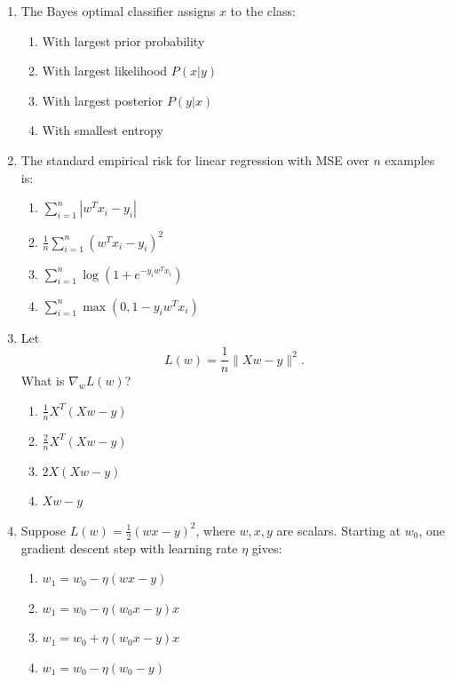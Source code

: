 \documentclass[11pt]{article}
\newcommand{\cmark}{\ding{51}}
\begin{document}
\begin{enumerate}[leftmargin=*]
\item The Bayes optimal classifier assigns $x$ to the class:

\begin{enumerate}[label=\Alph*.]
    \item With largest prior probability
    \item With largest likelihood $P(x|y)$
    \item With largest posterior $P(y|x)$ \cmark
    \item With smallest entropy
\end{enumerate}

\item The standard empirical risk for linear regression with MSE over $n$ examples is:

\begin{enumerate}[label=\Alph*.]
    \item $\sum_{i=1}^n |w^T x_i-y_i|$
    \item $\frac{1}{n}\sum_{i=1}^n (w^T x_i-y_i)^2$ \cmark
    \item $\sum_{i=1}^n \log(1+e^{-y_i w^T x_i})$
    \item $\sum_{i=1}^n \max(0,1-y_iw^Tx_i)$
\end{enumerate}

\item Let
\[
L(w)=\frac{1}{n}\|Xw-y\|^2.
\]
What is $\nabla_w L(w)$?

\begin{enumerate}[label=\Alph*.]
    \item $\frac{1}{n}X^T(Xw-y)$
    \item $\frac{2}{n}X^T(Xw-y)$ \cmark
    \item $2X(Xw-y)$
    \item $Xw-y$
\end{enumerate}

\item Suppose $L(w)=\frac{1}{2}(wx-y)^2$, where $w,x,y$ are scalars. Starting at $w_0$, one gradient descent step with learning rate $\eta$ gives:

\begin{enumerate}[label=\Alph*.]
    \item $w_1 = w_0 - \eta(wx-y)$
    \item $w_1 = w_0 - \eta(w_0x-y)x$ \cmark
    \item $w_1 = w_0 + \eta(w_0x-y)x$
    \item $w_1 = w_0 - \eta(w_0-y)$
\end{enumerate}


\end{enumerate}
\end{document}
